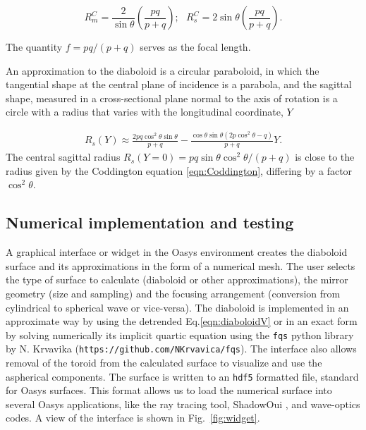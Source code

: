 \documentclass{iucr}       %
\begin{document}
\begin{equation}
\label{eqn:Coddington}
R_m^C = \frac{2}{\sin\theta}\left(\frac{p q}{p+q}\right);~~~R_s^C = 2\sin\theta \left(\frac{p q}{p+q}\right).
\end{equation}

\noindent The quantity $f=pq/(p+q)$ serves as the focal length.

An approximation to the diaboloid is a circular paraboloid, in which the tangential shape at the central plane of incidence is a parabola, and the sagittal shape, measured in a cross-sectional plane normal to the axis of rotation is a circle with a radius that varies with the longitudinal coordinate, $Y$ \cite{part2}

\begin{multline}
\label{eq:sagRadius}
R_s(Y) 
\approx 
\frac{2p q \cos^2\theta \sin\theta }{p + q} - 
\frac{\cos\theta \sin\theta (2 p \cos^2\theta - q)}{p + q} Y.
\end{multline}
The central sagittal radius $R_s(Y=0)=p q \sin\theta \cos^2\theta/ (p+q)$ is close to the radius given by the Coddington equation \ref{eqn:Coddington}, differing by a factor $\cos^2\theta$.


\subsection{Numerical implementation and testing}
\label{sec:oasys}

A graphical interface or widget in the Oasys environment creates the diaboloid surface and its approximations in the form of a numerical mesh. The user selects the type of surface to calculate (diaboloid or other approximations), the mirror geometry (size and sampling) and the focusing arrangement (conversion from cylindrical to spherical wave or vice-versa). 
The diaboloid is implemented in an approximate way by using the detrended Eq.\ref{eqn:diaboloidV} or in an exact form by solving numerically its implicit quartic equation using the {\tt fqs} python library by N. Krvavika ({\tt https://github.com/NKrvavica/fqs}). 
The interface also allows removal of the toroid from the calculated surface to visualize and use the aspherical components. The surface is written to an {\tt hdf5} formatted file, standard for Oasys surfaces. This format allows us to load the numerical surface into several Oasys applications, like the ray tracing tool, ShadowOui \cite{codeSHADOWOUI}, and wave-optics codes. A view of the interface is shown in Fig.~\ref{fig:widget}.
\end{document}
